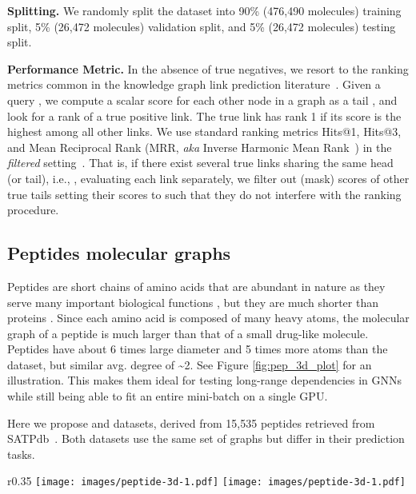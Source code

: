 \documentclass{article}
\begin{document}
\textbf{Splitting.} We randomly split the dataset into 90\% (476,490 molecules) training split, 5\% (26,472 molecules) validation split, and 5\% (26,472 molecules) testing split.

\textbf{Performance Metric.}
In the absence of true negatives, we resort to the ranking metrics common in the knowledge graph link prediction literature~\cite{transe}. Given a query , we compute a scalar score for each other node in a graph as a tail , and look for a rank of a true positive link. The true link has rank 1 if its score is the highest among all other links. We use standard ranking metrics Hits@1, Hits@3, and Mean Reciprocal Rank (MRR, \emph{aka} Inverse Harmonic Mean Rank~\cite{hoyt2022metrics}) in the \emph{filtered} setting~\cite{transe}. 
That is, if there exist several true links sharing the same head (or tail), i.e., , evaluating each link separately, we filter out (mask) scores of other true tails setting their scores to  such that they do not interfere with the ranking procedure.

\subsection{Peptides molecular graphs}
\label{sec:peptides}



Peptides are short chains of amino acids that are abundant in nature as they serve many important biological functions \cite{singh2016satpdb}, but they are much shorter than proteins \cite{naturePeptideLearn}. Since each amino acid is composed of many heavy atoms, the molecular graph of a peptide is much larger than that of a small drug-like molecule. Peptides have about 6 times large diameter and 5 times more atoms than the \pcqmcontact dataset, but similar avg. degree of \textasciitilde 2. See Figure \ref{fig:pep_3d_plot} for an illustration. This makes them ideal for testing long-range dependencies in GNNs while still being able to fit an entire mini-batch on a single GPU.




Here we propose \pepfunc and \pepstruct datasets, derived from 15,535 peptides retrieved from SATPdb~\cite{singh2016satpdb}. Both datasets use the same set of graphs but differ in their prediction tasks.

\begin{wrapfigure}{r}{0.35\textwidth}
\centering
\texttt{[image: images/peptide-3d-1.pdf]}
    \texttt{[image: images/peptide-3d-1.pdf]}
    \vspace{-10pt}
    \caption{\textbf{Top:} 3D Visualization of "GLLGPLLKIAAKVGKNLL" peptide. \textbf{Bottom:} The molecular graph for the same peptide. }
    \label{fig:pep_3d_plot}
    \vspace*{-20pt}
\end{wrapfigure}
\end{document}
